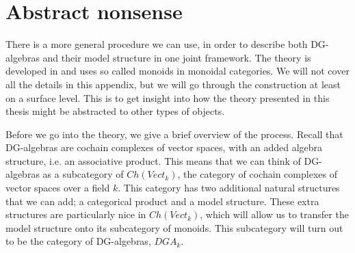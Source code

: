 
\section*{Abstract nonsense}

There is a more general procedure we can use, in order to describe both DG-algebras and their model structure in one joint framework. The theory is developed in \cite{monoid} and uses so called monoids in monoidal categories. We will not cover all the details in this appendix, but we will go through the construction at least on a surface level. This is to get insight into how the theory presented in this thesis might be abstracted to other types of objects. 

Before we go into the theory, we give a brief overview of the process. Recall that DG-algebras are cochain complexes of vector spaces, with an added algebra structure, i.e. an associative product. This means that we can think of DG-algebras as a subcategory of $Ch(Vect_k)$, the category of cochain complexes of vector spaces over a field $k$. This category has two additional natural structures that we can add; a categorical product and a model structure. These extra structures are particularly nice in $Ch(Vect_k)$, which will allow us to transfer the model structure onto its subcategory of monoids. This subcategory will turn out to be the category of DG-algebras, $DGA_k$.



